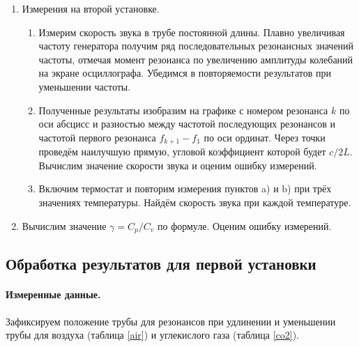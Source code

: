 \documentclass[a4paper,12pt]{article} %
\begin{document}
\begin{enumerate}
\item Измерения на второй установке.
\begin{enumerate}
\item Измерим скорость звука в трубе постоянной длины. Плавно увеличивая частоту генератора получим ряд последовательных резонансных значений частоты, отмечая момент резонанса по увеличению амплитуды колебаний на экране осциллографа. Убедимся в повторяемости результатов при уменьшении частоты.
\item Полученные результаты изобразим на графике с номером резонанса $k$ по оси абсцисс и разностью между частотой последующих резонансов и частотой первого резонанса $f_{k+1} - f_1$ по оси ординат. Через точки проведём наилучшую прямую, угловой коэффициент которой будет $c/2L$. Вычислим значение скорости звука и оценим ошибку измерений.
\item Включим термостат и повторим измерения пунктов a) и b) при трёх значениях температуры. Найдём скорость звука при каждой температуре.
\end{enumerate}

\item Вычислим значение $\gamma = C_p/C_v$ по формуле. Оценим ошибку измерений.

\end{enumerate}

\subsection{Обработка результатов для первой установки}

\paragraph{Измеренные данные.}

Зафиксируем положение трубы для резонансов при удлинении и уменьшении трубы для воздуха (таблица \ref{air}) и углекислого газа (таблица \ref{co2}).
\end{document}
